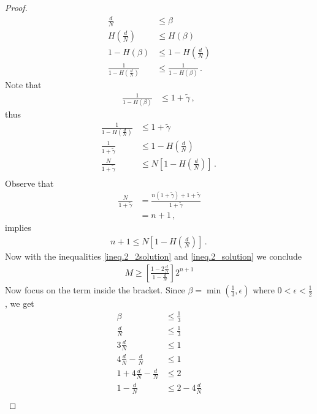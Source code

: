 \begin{proof}
\begin{align}
 \frac{d}{N} &\leq \beta
 \nonumber\\
 H(\frac{d}{N}) &\leq H(\beta)
 \nonumber\\
 1 - H(\beta) &\leq 1- H(\frac{d}{N})
 \nonumber\\
  \frac{1}{1- H(\frac{d}{N})} &\leq \frac{1}{1 - H(\beta)}\,.\,
\end{align}
Note that 
\begin{align}
    \frac{1}{1-H(\beta)} &\leq 1+\widetilde{\gamma} \,,\,
\end{align}
thus 
\begin{align}
  \frac{1}{1- H(\frac{d}{N})} &\leq 1+\widetilde{\gamma} 
  \nonumber\\
  \frac{1}{1+\widetilde{\gamma}} &\leq  1- H(\frac{d}{N})
  \nonumber\\
  \frac{N}{1+\widetilde{\gamma}} &\leq  N \left[1- H(\frac{d}{N})\right]\,.\,
  \nonumber\\
\end{align}
Observe that 
\begin{align}
   \frac{N}{1+\widetilde{\gamma}}   & = \frac{n(1+\widetilde{\gamma}) + 1 + \widetilde{\gamma}}{1+\widetilde{\gamma}}
  \nonumber\\
  & = n + 1 \,,\,
\end{align}
implies 
\begin{align}
\label{ineq.2_2solution}
   n + 1  \leq  N \left[1- H(\frac{d}{N})\right]\,.\,
\end{align}
Now with the inequalities \eqref{ineq.2_2solution} and \eqref{ineq.2_solution} we conclude 
\begin{align}
\label{ineq.Solution2}
     M \geq  \left[\frac{1-2\frac{d}{N}}{1-\frac{d}{N}} \right] 2^{n+1}
\end{align}
Now focus on the term inside the bracket. Since
$\beta=\min(\frac{1}{3},\epsilon)$ where $0<\epsilon<\frac{1}{2}$, we get 
\begin{align}
    \beta &\leq \frac{1}{3}
    \nonumber\\
    \frac{d}{N} &\leq \frac{1}{3}
    \nonumber\\
    3\frac{d}{N} &\leq 1
    \nonumber\\
    4\frac{d}{N} - \frac{d}{N} &\leq 1
    \nonumber\\
    1 + 4\frac{d}{N} - \frac{d}{N} &\leq 2
    \nonumber\\
    1-\frac{d}{N}&\leq 2-4\frac{d}{N}
    \nonumber\\
    \label{Ineq.5}

\end{align}
\end{proof}
